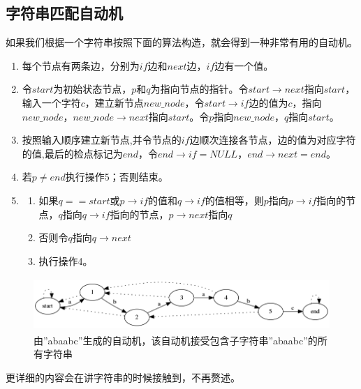\documentclass[a4paper]{article}
\begin{document}
\begin{CJK}{UTF8}{gbsn}
\subsection{字符串匹配自动机}
如果我们根据一个字符串按照下面的算法构造，就会得到一种非常有用的自动机。
\begin{enumerate}
\item 每个节点有两条边，分别为$if$边和$next$边，$if$边有一个值。
\item 令$start$为初始状态节点，$p$和$q$为指向节点的指针。令$start\rightarrow next$指向$start$，输入一个字符$c$，建立新节点$new\_ node$，令$start\rightarrow if$边的值为$c$，指向$new\_ node$，$new\_ node\rightarrow next$指向$start$。令$p$指向$new\_ node$，$q$指向$start$。
\item 按照输入顺序建立新节点,并令节点的$if$边顺次连接各节点，边的值为对应字符的值,最后的检点标记为$end$，令$end\rightarrow if=NULL$，$end\rightarrow next=end$。
\item 若$p\neq end$执行操作5；否则结束。
\item 
\begin{enumerate}
\item 如果$q==start$或$p\rightarrow if$的值和$q\rightarrow if$的值相等，则$p$指向$p\rightarrow if$指向的节点，$q$指向$q\rightarrow if$指向的节点，$p\rightarrow next$指向$q$
\item 否则令$q$指向$q\rightarrow next$
\item 执行操作4。
\end{enumerate}
\end{enumerate}

\begin{figure}[htbp]
\centering\includegraphics[height=2cm]{auto3.png}
\caption{由''abaabc''生成的自动机，该自动机接受包含子字符串''abaabc''的所有字符串}
\end{figure}

更详细的内容会在讲字符串的时候接触到，不再赘述。

\newpage
\nocite{*}




\end{CJK}
\end{document}
